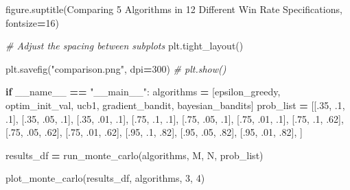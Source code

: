 \documentclass[
]{book}
\newenvironment{Shaded}{\begin{snugshade}}{\end{snugshade}}
\newcommand{\CommentTok}[1]{\textcolor[rgb]{0.56,0.35,0.01}{\textit{#1}}}
\newcommand{\ControlFlowTok}[1]{\textcolor[rgb]{0.13,0.29,0.53}{\textbf{#1}}}
\newcommand{\DecValTok}[1]{\textcolor[rgb]{0.00,0.00,0.81}{#1}}
\newcommand{\FloatTok}[1]{\textcolor[rgb]{0.00,0.00,0.81}{#1}}
\newcommand{\NormalTok}[1]{#1}
\newcommand{\OperatorTok}[1]{\textcolor[rgb]{0.81,0.36,0.00}{\textbf{#1}}}
\newcommand{\StringTok}[1]{\textcolor[rgb]{0.31,0.60,0.02}{#1}}
\newcommand{\VariableTok}[1]{\textcolor[rgb]{0.00,0.00,0.00}{#1}}
\theoremstyle{definition}
\theoremstyle{definition}
\theoremstyle{definition}
\theoremstyle{definition}
\theoremstyle{remark}
\begin{document}
\begin{Shaded}
\begin{Highlighting}[]
\NormalTok{    figure.suptitle(}\StringTok{\textquotesingle{}Comparing 5 Algorithms in 12 Different Win Rate Specifications\textquotesingle{}}\NormalTok{, fontsize}\OperatorTok{=}\DecValTok{16}\NormalTok{)}

    \CommentTok{\# Adjust the spacing between subplots}
\NormalTok{    plt.tight\_layout()}

\NormalTok{    plt.savefig(}\StringTok{"comparison.png"}\NormalTok{, dpi}\OperatorTok{=}\DecValTok{300}\NormalTok{)}
    \CommentTok{\# plt.show()}


\ControlFlowTok{if} \VariableTok{\_\_name\_\_} \OperatorTok{==} \StringTok{"\_\_main\_\_"}\NormalTok{:}
\NormalTok{    algorithms }\OperatorTok{=}\NormalTok{ [}\StringTok{\textquotesingle{}epsilon\_greedy\textquotesingle{}}\NormalTok{, }\StringTok{\textquotesingle{}optim\_init\_val\textquotesingle{}}\NormalTok{, }\StringTok{\textquotesingle{}ucb1\textquotesingle{}}\NormalTok{, }\StringTok{\textquotesingle{}gradient\_bandit\textquotesingle{}}\NormalTok{, }\StringTok{\textquotesingle{}bayesian\_bandits\textquotesingle{}}\NormalTok{]}
\NormalTok{    prob\_list }\OperatorTok{=}\NormalTok{ [[}\FloatTok{.35}\NormalTok{, }\FloatTok{.1}\NormalTok{, }\FloatTok{.1}\NormalTok{], [}\FloatTok{.35}\NormalTok{, }\FloatTok{.05}\NormalTok{, }\FloatTok{.1}\NormalTok{], [}\FloatTok{.35}\NormalTok{, }\FloatTok{.01}\NormalTok{, }\FloatTok{.1}\NormalTok{],}
\NormalTok{                 [}\FloatTok{.75}\NormalTok{, }\FloatTok{.1}\NormalTok{, }\FloatTok{.1}\NormalTok{], [}\FloatTok{.75}\NormalTok{, }\FloatTok{.05}\NormalTok{, }\FloatTok{.1}\NormalTok{], [}\FloatTok{.75}\NormalTok{, }\FloatTok{.01}\NormalTok{, }\FloatTok{.1}\NormalTok{],}
\NormalTok{                 [}\FloatTok{.75}\NormalTok{, }\FloatTok{.1}\NormalTok{, }\FloatTok{.62}\NormalTok{], [}\FloatTok{.75}\NormalTok{, }\FloatTok{.05}\NormalTok{, }\FloatTok{.62}\NormalTok{], [}\FloatTok{.75}\NormalTok{, }\FloatTok{.01}\NormalTok{, }\FloatTok{.62}\NormalTok{],}
\NormalTok{                 [}\FloatTok{.95}\NormalTok{, }\FloatTok{.1}\NormalTok{, }\FloatTok{.82}\NormalTok{], [}\FloatTok{.95}\NormalTok{, }\FloatTok{.05}\NormalTok{, }\FloatTok{.82}\NormalTok{], [}\FloatTok{.95}\NormalTok{, }\FloatTok{.01}\NormalTok{, }\FloatTok{.82}\NormalTok{],}
\NormalTok{                 ]}

\NormalTok{    results\_df }\OperatorTok{=}\NormalTok{ run\_monte\_carlo(algorithms, M, N, prob\_list)}

\NormalTok{    plot\_monte\_carlo(results\_df, algorithms, }\DecValTok{3}\NormalTok{, }\DecValTok{4}\NormalTok{)}
\end{Highlighting}
\end{Shaded}
\end{document}
